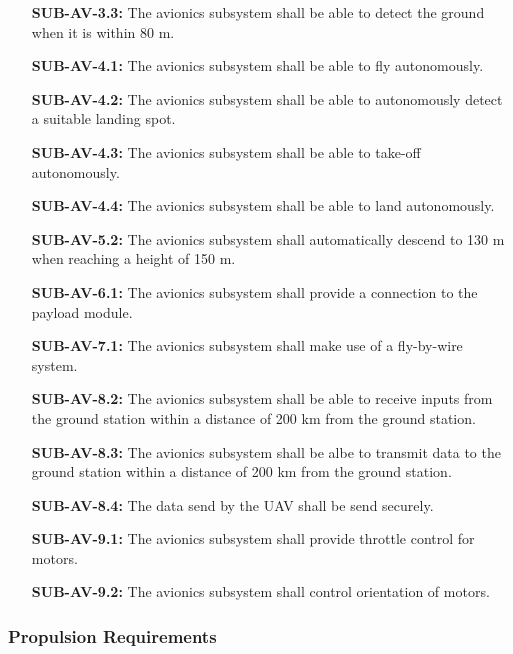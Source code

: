 \begin{enumerate}[leftmargin =3.5cm, align=parleft, labelwidth=8em]
    \item[\textbf{SUB-AV-3.3:}] The avionics subsystem shall be able to detect the ground when it is within 80 m.
    \item[\textbf{SUB-AV-4.1:}] The avionics subsystem shall be able to fly autonomously.
    \item[\textbf{SUB-AV-4.2:}] The avionics subsystem shall be able to autonomously detect a suitable landing spot.
    \item[\textbf{SUB-AV-4.3:}] The avionics subsystem shall be able to take-off autonomously.
    \item[\textbf{SUB-AV-4.4:}] The avionics subsystem shall be able to land autonomously.
    \item[\textbf{SUB-AV-5.2:}] The avionics subsystem shall automatically descend to 130 m when reaching a height of 150 m.
    \item[\textbf{SUB-AV-6.1:}] The avionics subsystem shall provide a connection to the payload module.
    \item[\textbf{SUB-AV-7.1:}] The avionics subsystem shall make use of a fly-by-wire system.
    \item[\textbf{SUB-AV-8.2:}] The avionics subsystem shall be able to receive inputs from the ground station within a distance of 200 km from the ground station.
    \item[\textbf{SUB-AV-8.3:}] The avionics subsystem shall be albe to transmit data to the ground station within a distance of 200 km from the ground station.
    \item[\textbf{SUB-AV-8.4:}] The data send by the UAV shall be send securely.
    \item[\textbf{SUB-AV-9.1:}] The avionics subsystem shall provide throttle control for motors.
    \item[\textbf{SUB-AV-9.2:}] The avionics subsystem shall control orientation of motors.
\end{enumerate}

\subsubsection{Propulsion Requirements}

